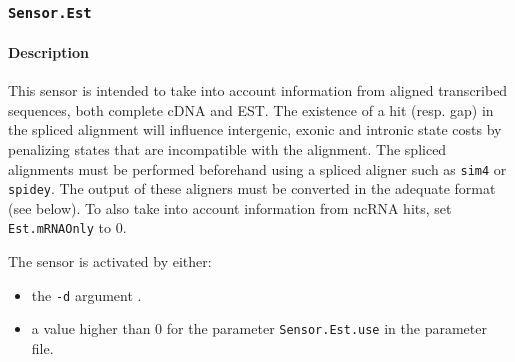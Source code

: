 
\subsubsection{\texttt{Sensor.Est}}
\label{plugest}

\paragraph{Description}

This sensor is intended to take into account information from aligned
transcribed sequences, both complete cDNA and EST. The existence of a
hit (resp. gap) in the spliced alignment will influence intergenic,
exonic and intronic state costs by penalizing states that are
incompatible with the alignment. The spliced alignments must be
performed beforehand using a spliced aligner such as \texttt{sim4} or
\texttt{spidey}. The output of these aligners must be converted in the
adequate format (see below).  To also take into account information
from ncRNA hits, set \texttt{Est.mRNAOnly} to 0.

The sensor is activated by either:
\begin{itemize}
\item the \texttt{-d} argument .
\item a value higher than 0 for the parameter \texttt{Sensor.Est.use} in
  the parameter file.
\end{itemize}

